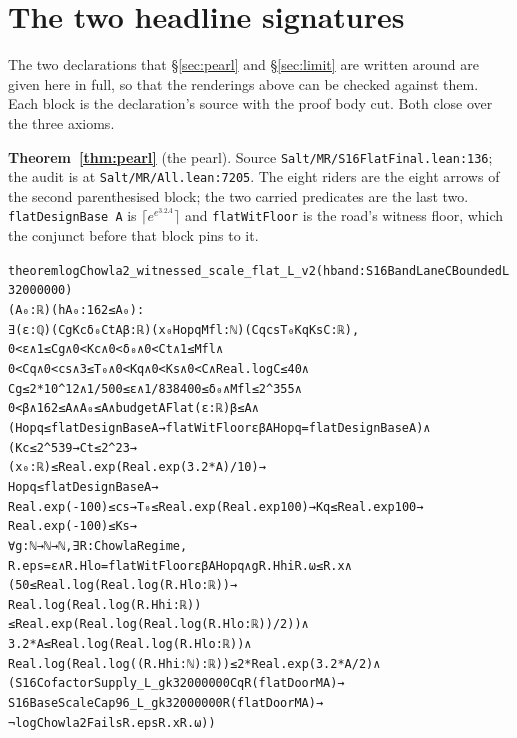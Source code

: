 \documentclass[11pt]{amsart}
\newcommand{\leaninline}[1]{{\small\texttt{#1}}}
\theoremstyle{remark}
\begin{document}
\section{The two headline signatures}\label{app:signatures}

The two declarations that \S\ref{sec:pearl} and \S\ref{sec:limit} are written
around are given here in full, so that the renderings above can be checked
against them. Each block is the declaration's source with the proof body cut.
Both close over the three axioms.

\medskip\noindent\textbf{Theorem~\ref{thm:pearl}} (the pearl). Source
\leaninline{Salt/\allowbreak MR/\allowbreak S16FlatFinal.lean:136}; the audit is at
\leaninline{Salt/\allowbreak MR/\allowbreak All.lean:7205}. The eight riders are the eight arrows of
the second parenthesised block; the two carried predicates are the last two.
\leaninline{flatDesignBase A} is $\lceil e^{e^{3.2A}}\rceil$ and
\leaninline{flatWitFloor} is the road's witness floor, which the conjunct
before that block pins to it.
{\footnotesize\begin{alltt}
theorem logChowla2_witnessed_scale_flat_L_v2 (hband : S16BandLaneCBoundedL 32000000)
    (A₀ : ℝ) (hA₀ : 162 ≤ A₀) :
    ∃ (ε : ℚ) (Cg Kc δ₀ Ct A β : ℝ) (x₀ Hopq Mfl : ℕ) (Cq cs T₀ Kq Ks C : ℝ),
      0 < ε ∧ 1 ≤ Cg ∧ 0 < Kc ∧ 0 < δ₀ ∧ 0 < Ct ∧ 1 ≤ Mfl ∧
      0 < Cq ∧ 0 < cs ∧ 3 ≤ T₀ ∧ 0 < Kq ∧ 0 < Ks ∧ 0 < C ∧ Real.log C ≤ 40 ∧
      Cg ≤ 2 * 10 ^ 12 ∧ 1 / 500 ≤ ε ∧ 1 / 838400 ≤ δ₀ ∧ Mfl ≤ 2 ^ 355 ∧
      0 < β ∧ 162 ≤ A ∧ A₀ ≤ A ∧ budgetAFlat (ε : ℝ) β ≤ A ∧
      (Hopq ≤ flatDesignBase A → flatWitFloor ε β A Hopq = flatDesignBase A) ∧
      (Kc ≤ 2 ^ 539 → Ct ≤ 2 ^ 23 →
        (x₀ : ℝ) ≤ Real.exp (Real.exp (3.2 * A) / 10) →
        Hopq ≤ flatDesignBase A →
        Real.exp (-100) ≤ cs → T₀ ≤ Real.exp (Real.exp 100) → Kq ≤ Real.exp 100 →
        Real.exp (-100) ≤ Ks →
        ∀ g : ℕ → ℕ → ℕ, ∃ R : ChowlaRegime,
          R.eps = ε ∧ R.Hlo = flatWitFloor ε β A Hopq ∧ g R.Hhi R.ω ≤ R.x ∧
          (50 ≤ Real.log (Real.log (R.Hlo : ℝ)) →
            Real.log (Real.log (R.Hhi : ℝ))
              ≤ Real.exp (Real.log (Real.log (R.Hlo : ℝ)) / 2)) ∧
          3.2 * A ≤ Real.log (Real.log (R.Hlo : ℝ)) ∧
          Real.log (Real.log ((R.Hhi : ℕ) : ℝ)) ≤ 2 * Real.exp (3.2 * A / 2) ∧
          (S16CofactorSupply_L_gk 32000000 Cq R (flatDoorM A) →
            S16BaseScaleCap96_L_gk 32000000 R (flatDoorM A) →
              ¬ logChowla2Fails R.eps R.x R.ω))
\end{alltt}}
\end{document}
